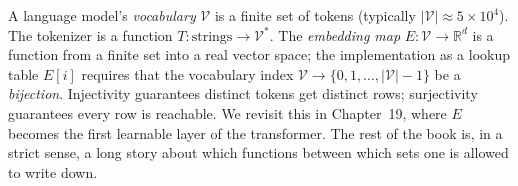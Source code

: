 A language model's \emph{vocabulary} $\mathcal{V}$ is a finite set of tokens (typically $|\mathcal{V}| \approx 5 \times 10^{4}$). The tokenizer is a function $T : \text{strings} \to \mathcal{V}^{*}$. The \emph{embedding map} $E : \mathcal{V} \to \mathbb{R}^{d}$ is a function from a finite set into a real vector space; the implementation as a lookup table $E[i]$ requires that the vocabulary index $\mathcal{V} \to \{0, 1, \ldots, |\mathcal{V}|-1\}$ be a \emph{bijection}. Injectivity guarantees distinct tokens get distinct rows; surjectivity guarantees every row is reachable. We revisit this in Chapter~19, where $E$ becomes the first learnable layer of the transformer. The rest of the book is, in a strict sense, a long story about which functions between which sets one is allowed to write down.

